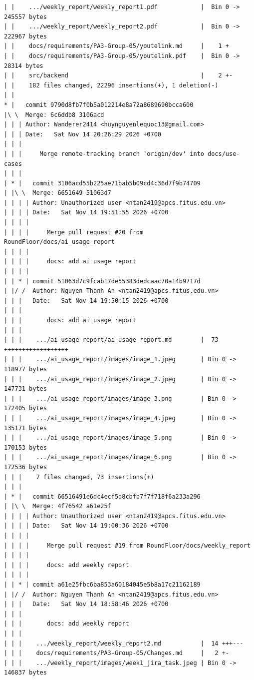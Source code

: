 \documentclass[12pt]{article}
\begin{document}
\begin{lstlisting}[numbers=none,breaklines=true]
| |    .../weekly_report/weekly_report1.pdf            |  Bin 0 -> 245557 bytes
| |    .../weekly_report/weekly_report2.pdf            |  Bin 0 -> 222967 bytes
| |    docs/requirements/PA3-Group-05/youtelink.md     |    1 +
| |    docs/requirements/PA3-Group-05/youtelink.pdf    |  Bin 0 -> 28314 bytes
| |    src/backend                                     |    2 +-
| |    182 files changed, 22296 insertions(+), 1 deletion(-)
| |
* |   commit 9790d8fb7f0b5a012214e8a72a8689690bcca600
|\ \  Merge: 6c6ddb8 3106acd
| | | Author: Wanderer2414 <huynguyenlequoc13@gmail.com>
| | | Date:   Sat Nov 14 20:26:29 2026 +0700
| | |
| | |     Merge remote-tracking branch 'origin/dev' into docs/use-cases
| | |
| * |   commit 3106acd55b225ae71bab5b09cd4c36d7f9b74709
| |\ \  Merge: 6651649 51063d7
| | | | Author: Unauthorized user <ntan2419@apcs.fitus.edu.vn>
| | | | Date:   Sat Nov 14 19:51:55 2026 +0700
| | | |
| | | |     Merge pull request #20 from RoundFloor/docs/ai_usage_report
| | | |
| | | |     docs: add ai usage report
| | | |
| | * | commit 51063d7c9fcab17de55383dedcaac70a14b9717d
| |/ /  Author: Nguyen Thanh An <ntan2419@apcs.fitus.edu.vn>
| | |   Date:   Sat Nov 14 19:50:15 2026 +0700
| | |
| | |       docs: add ai usage report
| | |
| | |    .../ai_usage_report/ai_usage_report.md        |  73 ++++++++++++++++++
| | |    .../ai_usage_report/images/image_1.jpeg       | Bin 0 -> 118977 bytes
| | |    .../ai_usage_report/images/image_2.jpeg       | Bin 0 -> 147731 bytes
| | |    .../ai_usage_report/images/image_3.png        | Bin 0 -> 172405 bytes
| | |    .../ai_usage_report/images/image_4.jpeg       | Bin 0 -> 135171 bytes
| | |    .../ai_usage_report/images/image_5.png        | Bin 0 -> 170153 bytes
| | |    .../ai_usage_report/images/image_6.png        | Bin 0 -> 172536 bytes
| | |    7 files changed, 73 insertions(+)
| | |
| * |   commit 66516491e6dc4ecf5d8cbfb7f7f718f6a233a296
| |\ \  Merge: 4f76542 a61e25f
| | | | Author: Unauthorized user <ntan2419@apcs.fitus.edu.vn>
| | | | Date:   Sat Nov 14 19:00:36 2026 +0700
| | | |
| | | |     Merge pull request #19 from RoundFloor/docs/weekly_report
| | | |
| | | |     docs: add weekly report
| | | |
| | * | commit a61e25fbc6ba853a60184045e5b8a17c21162189
| |/ /  Author: Nguyen Thanh An <ntan2419@apcs.fitus.edu.vn>
| | |   Date:   Sat Nov 14 18:58:46 2026 +0700
| | |
| | |       docs: add weekly report
| | |
| | |    .../weekly_report/weekly_report2.md           |  14 +++---
| | |    docs/requirements/PA3-Group-05/Changes.md     |   2 +-
| | |    .../weekly_report/images/week1_jira_task.jpeg | Bin 0 -> 146837 bytes

\end{lstlisting}
\end{document}
